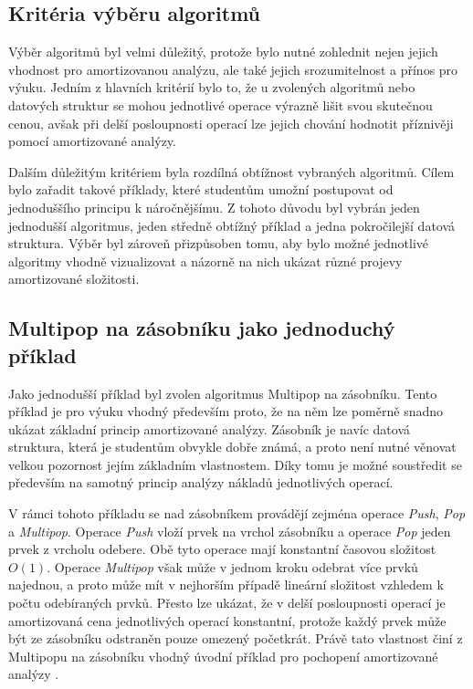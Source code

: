 \subsection{Kritéria výběru algoritmů}
Výběr algoritmů byl velmi důležitý, protože bylo nutné zohlednit nejen jejich vhodnost pro amortizovanou analýzu, ale také jejich srozumitelnost a přínos pro výuku. Jedním z hlavních kritérií bylo to, že u zvolených algoritmů nebo datových struktur se mohou jednotlivé operace výrazně lišit svou skutečnou cenou, avšak při delší posloupnosti operací lze jejich chování hodnotit příznivěji pomocí amortizované analýzy.

Dalším důležitým kritériem byla rozdílná obtížnost vybraných algoritmů. Cílem bylo zařadit takové příklady, které studentům umožní postupovat od jednoduššího principu k náročnějšímu. Z tohoto důvodu byl vybrán jeden jednodušší algoritmus, jeden středně obtížný příklad a jedna pokročilejší datová struktura. Výběr byl zároveň přizpůsoben tomu, aby bylo možné jednotlivé algoritmy vhodně vizualizovat a názorně na nich ukázat různé projevy amortizované složitosti.

\subsection{Multipop na zásobníku jako jednoduchý příklad}
Jako jednodušší příklad byl zvolen algoritmus Multipop na zásobníku. Tento příklad je pro výuku vhodný především proto, že na něm lze poměrně snadno ukázat základní princip amortizované analýzy. Zásobník je navíc datová struktura, která je studentům obvykle dobře známá, a proto není nutné věnovat velkou pozornost jejím základním vlastnostem. Díky tomu je možné soustředit se především na samotný princip analýzy nákladů jednotlivých operací.

V rámci tohoto příkladu se nad zásobníkem provádějí zejména operace \textit{Push}, \textit{Pop} a \textit{Multipop}. Operace \textit{Push} vloží prvek na vrchol zásobníku a operace \textit{Pop} jeden prvek z vrcholu odebere. Obě tyto operace mají konstantní časovou složitost \(O(1)\). Operace \textit{Multipop} však může v jednom kroku odebrat více prvků najednou, a proto může mít v nejhorším případě lineární složitost vzhledem k počtu odebíraných prvků. Přesto lze ukázat, že v delší posloupnosti operací je amortizovaná cena jednotlivých operací konstantní, protože každý prvek může být ze zásobníku odstraněn pouze omezený početkrát. Právě tato vlastnost činí z Multipopu na zásobníku vhodný úvodní příklad pro pochopení amortizované analýzy \cite{cornell_multipop}.

